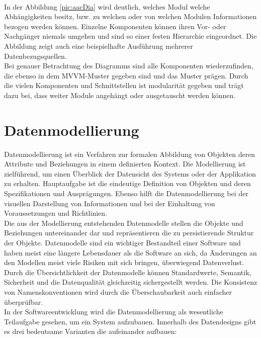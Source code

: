 \\ 
In der Abbildung \ref{pic:aacDia} wird deutlich, welches Modul welche Abhängigkeiten besitz, bzw. zu welchen oder von welchen Modulen 
Informationen bezogen werden können. Einzelne Komponenten können ihren Vor- oder Nachgänger niemals umgehen und sind so einer festen 
Hierarchie eingeordnet. Die Abbildung zeigt auch eine beispielhafte Ausführung mehrerer Datenbezugsquellen.
\\ 
Bei genauer Betrachtung des Diagramms sind alle Komponenten wiederzufinden, die ebenso in dem MVVM-Muster gegeben 
sind und das Muster prägen. Durch die vielen Komponenten und Schnittstellen ist modularität gegeben und trägt dazu bei, dass weiter Module 
angehängt oder ausgetauscht werden können. 

\section{Datenmodellierung}
\label{chap:Datenmodellierung}
Datenmodellierung ist ein Verfahren zur formalen Abbildung von Objekten deren Attribute und Beziehungen in einem definierten Kontext. Die 
Modellierung ist zielführend, um einen Überblick der Datensicht des Systems oder der Applikation zu erhalten. Hauptaufgabe ist die eindeutige 
Definition von Objekten und deren Spezifikationen und Ausprägungen. Ebenso hilft die Datenmodellierung bei der visuellen Darstellung von 
Informationen und bei der Einhaltung von Voraussetzungen und Richtlinien.
\\ 
Die aus der Modellierung entstehenden Datenmodelle stellen die Objekte und Beziehungen untereinander dar und repräsentieren die zu 
persistierende Struktur der Objekte. Datenmodelle sind ein wichtiger Bestandteil einer Software und haben meist eine längere Lebensdauer als 
die Software an sich, da Änderungen an den Modellen meist viele Risiken mit sich bringen, überwiegend Datenverlust.
\\ 
\linebreak
Durch die Übersichtlichkeit der Datenmodelle können Standardwerte, Semantik, Sicherheit und die Datenqualität gleichzeitig sichergestellt 
werden. Die Konsistenz von Namenskonventionen wird durch die Überschaubarkeit auch einfacher überprüfbar. 
\\ 
\linebreak
In der Softwareentwicklung wird die Datenmodellierung als wesentliche Teilaufgabe gesehen, um ein System aufzubauen. Innerhalb des 
Datendesigns gibt es drei bedeutsame Varianten die aufeinander aufbauen:
